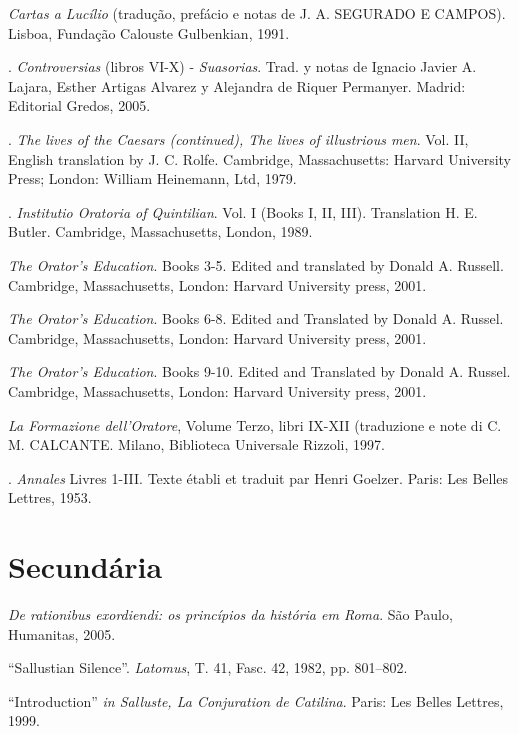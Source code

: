 \begin{bibliohedra}
 \emph{Cartas a Lucílio} (tradução, prefácio e notas de J. A. SEGURADO E CAMPOS). Lisboa, Fundação Calouste Gulbenkian, 1991.

. \emph{Controversias} (libros VI-X) - \emph{Suasorias}. Trad. y notas de Ignacio Javier A. Lajara, Esther Artigas Alvarez y Alejandra de Riquer Permanyer. Madrid: Editorial Gredos, 2005. 

. \emph{The lives of the Caesars (continued), The lives of illustrious men}. Vol. II, English translation by J. C. Rolfe. Cambridge, Massachusetts: Harvard University Press; London: William Heinemann, Ltd, 1979.

. \emph{Institutio Oratoria of Quintilian}. Vol. I (Books I, II, III). Translation H. E. Butler. Cambridge, Massachusetts, London, 1989.

\titidem \emph{The Orator’s Education}. Books 3-5. Edited and translated by Donald A. Russell. Cambridge, Massachusetts, London: Harvard University press, 2001.

\titidem \emph{The Orator’s Education}. Books 6-8. Edited and Translated by Donald A. Russel. Cambridge, Massachusetts, London: Harvard University press, 2001.


\titidem \emph{The Orator’s Education}. Books 9-10. Edited and Translated by Donald A. Russel. Cambridge, Massachusetts, London: Harvard University press, 2001.

 \emph{La Formazione dell’Oratore}, Volume Terzo, libri IX-XII (traduzione e note di C. M. CALCANTE. Milano, Biblioteca Universale Rizzoli, 1997.


.  \emph{Annales} Livres 1-III. Texte établi et traduit par Henri Goelzer. Paris: Les Belles Lettres, 1953. 



\section{Secundária}



 \emph{De rationibus exordiendi: os princípios da história em Roma}. São Paulo, Humanitas, 2005.



 ``Sallustian Silence”. \emph{Latomus}, T. 41, Fasc. 42, 1982, pp. 801–802.



 ``Introduction'' \emph{in Salluste, La Conjuration de Catilina}. Paris: Les Belles Lettres, 1999.  


\end{bibliohedra}
